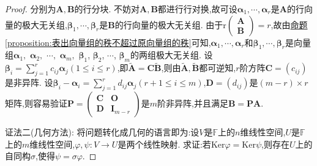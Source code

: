 \documentclass[../../main.tex]{subfiles}%
\begin{document}
\begin{proof}
分别为\(\boldsymbol{A},\boldsymbol{B}\)的行分块. 不妨对\(\boldsymbol{A},\boldsymbol{B}\)都进行行对换,故可设\(\boldsymbol{\alpha}_1,\cdots,\boldsymbol{\alpha}_r\)是\(\boldsymbol{A}\)的行向量的极大无关组,\(\boldsymbol{\beta}_1,\cdots,\boldsymbol{\beta}_r\)是\(\boldsymbol{B}\)的行向量的极大无关组. 由于\(\text{r}\begin{pmatrix}\boldsymbol{A}\\\boldsymbol{B}\end{pmatrix}=r\),故由\hyperref[proposition:表出向量组的秩不超过原向量组的秩]{命题\ref{proposition:表出向量组的秩不超过原向量组的秩}}可知,\(\boldsymbol{\alpha}_1,\cdots,\boldsymbol{\alpha}_r\)和\(\boldsymbol{\beta}_1,\cdots,\boldsymbol{\beta}_r\)是向量组$\boldsymbol{\alpha}_1,$ $\boldsymbol{\alpha}_2,$ $\cdots,$ $\boldsymbol{\alpha}_m,$ $\boldsymbol{\beta}_1$, $\boldsymbol{\beta}_2$, $\cdots$, $\boldsymbol{\beta}_m$的两组极大无关组. 设\(\boldsymbol{\beta}_i=\sum_{j = 1}^{r}c_{ij}\boldsymbol{\alpha}_j(1\leqslant  i\leqslant  r)\),即$\widetilde{\boldsymbol{A}}=\boldsymbol{C}\widetilde{\boldsymbol{B}}$,则由$\widetilde{\boldsymbol{A}},\widetilde{\boldsymbol{B}}$都可逆知,\(r\)阶方阵\(\boldsymbol{C}=(c_{ij})\)是非异阵. 设\(\boldsymbol{\beta}_i-\boldsymbol{\alpha}_i=\sum_{j = 1}^{r}d_{ij}\boldsymbol{\alpha}_j(r + 1\leqslant  i\leqslant  m)\),\(\boldsymbol{D}=(d_{ij})\)是\((m - r)\times r\)矩阵,则容易验证\(\boldsymbol{P}=\begin{pmatrix}\boldsymbol{C}&\boldsymbol{O}\\\boldsymbol{D}&\boldsymbol{I}_{m - r}\end{pmatrix}\)是\(m\)阶非异阵,并且满足\(\boldsymbol{B}=\boldsymbol{P}\boldsymbol{A}\).

{\color{blue}证法二(几何方法):}  将问题转化成几何的语言即为:设\(V\)是\(\mathbb{F}\)上的\(n\)维线性空间,\(U\)是\(\mathbb{F}\)上的\(m\)维线性空间,\(\varphi,\psi:V\to U\)是两个线性映射. 求证:若\(\text{Ker}\varphi=\text{Ker}\psi\),则存在\(U\)上的自同构\(\sigma\),使得\(\psi=\sigma\varphi\).


\end{proof}
\end{document}
